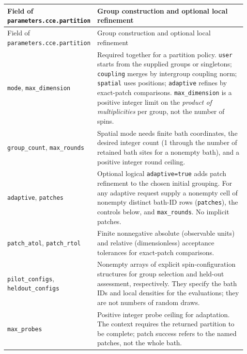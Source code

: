\documentclass[11pt,a4paper]{article}
\newcommand{\code}[1]{\texttt{#1}}
\begin{document}
\begingroup\small
\begin{longtable}{@{}>{\raggedright\arraybackslash}p{0.335\linewidth}@{\hspace{0.025\linewidth}}>{\raggedright\arraybackslash}p{0.64\linewidth}@{}}
\toprule
Field of \code{parameters.cce.partition} & Group construction and optional local refinement\\
\midrule\endfirsthead
\toprule
Field of \code{parameters.cce.partition} & Group construction and optional local refinement\\
\midrule\endhead
\midrule\endfoot
\bottomrule\endlastfoot
\code{mode}, \code{max\_dimension} & Required together for a partition policy. \code{user} starts from the supplied groups or singletons; \code{coupling} merges by intergroup coupling norm; \code{spatial} uses positions; \code{adaptive} refines by exact-patch comparisons. \code{max\_dimension} is a positive integer limit on the \emph{product of multiplicities} per group, not the number of spins.\\
\code{group\_count}, \code{max\_rounds} & Spatial mode needs finite bath coordinates, the desired integer count (1 through the number of retained bath sites for a nonempty bath), and a positive integer round ceiling.\\
\code{adaptive}, \code{patches} & Optional logical \code{adaptive=true} adds patch refinement to the chosen initial grouping. For any adaptive request supply a nonempty cell of nonempty distinct bath-ID rows (\code{patches}), the controls below, and \code{max\_rounds}. No implicit patches.\\
\code{patch\_atol}, \code{patch\_rtol} & Finite nonnegative absolute (observable units) and relative (dimensionless) acceptance tolerances for exact-patch comparisons.\\
\code{pilot\_configs}, \code{heldout\_configs} & Nonempty arrays of explicit spin-configuration structures for group selection and held-out assessment, respectively. They specify the bath IDs and local densities for the evaluations; they are not numbers of random draws.\\
\code{max\_probes} & Positive integer probe ceiling for adaptation. The context requires the returned partition to be complete; patch success refers to the named patches, not the whole bath.\\
\end{longtable}
\endgroup
\end{document}
